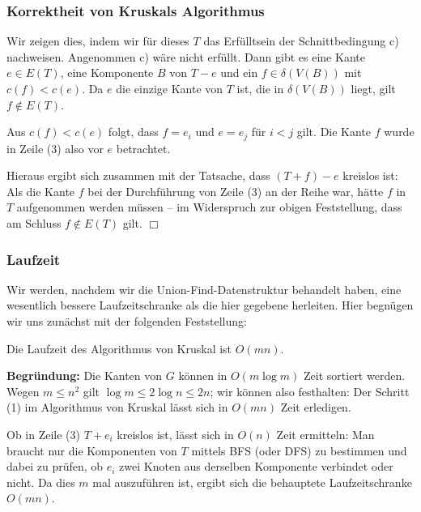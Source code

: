 \documentclass[smaller]{beamer}
\begin{document}
\begin{frame}
 \frametitle{Korrektheit von Kruskals Algorithmus}
 Wir zeigen dies, indem wir für dieses $T$ das Erfülltsein der \alert{Schnittbedingung} c) nachweisen. Angenommen c) wäre nicht erfüllt. Dann gibt es eine Kante $e \in E(T)$, eine Komponente $B$ von $T-e$ und ein $f \in \delta(V(B))$ mit $c(f) < c(e)$. Da $e$ die einzige Kante von $T$ ist, die in $\delta(V(B))$ liegt, gilt $f \notin E(T)$. \\ \medskip

Aus $c(f)<c(e)$ folgt, dass $f=e_i$ und $e=e_j$ für $i<j$ gilt. \alert{Die Kante $f$ wurde in Zeile (3) also vor $e$ betrachtet.} \\ \medskip

Hieraus ergibt sich zusammen mit der Tatsache, dass $(T+f)-e$ kreislos ist: Als die Kante $f$ bei der Durchführung von Zeile (3) an der Reihe war, hätte $f$ in $T$ aufgenommen werden müssen -- im Widerspruch zur obigen Feststellung, dass am Schluss $f \notin E(T)$ gilt. \qquad $\Box$
\end{frame}

\begin{frame}
 \frametitle{Laufzeit}
 Wir werden, nachdem wir die Union-Find-Daten\-struk\-tur behandelt haben, eine wesentlich bessere Laufzeitschranke als die hier gegebene herleiten. Hier begnügen wir uns zunächst mit der folgenden Feststellung: \\ \medskip
 
 \alert{Die Laufzeit des Algorithmus von Kruskal ist $O(mn)$.} \\ \medskip

\textbf{Begründung:} Die Kanten von $G$ können in $O(m \log m)$ Zeit sortiert werden. Wegen $m \leq n^2$ gilt $\log m \leq 2 \log n \leq 2n$; wir können also festhalten: \alert{Der Schritt (1) im Algorithmus von Kruskal lässt sich in $O(mn)$ Zeit erledigen.} \\ \medskip

\alert{Ob in Zeile (3) $T+e_i$ kreislos ist, lässt sich in $O(n)$ Zeit ermitteln:} Man braucht nur die Komponenten von $T$ mittels BFS (oder DFS) zu bestimmen und dabei zu prüfen, ob $e_i$ zwei Knoten aus derselben Komponente verbindet oder nicht. Da dies $m$ mal auszuführen ist, ergibt sich die behauptete Laufzeitschranke $O(mn)$.
\end{frame}
\end{document}
